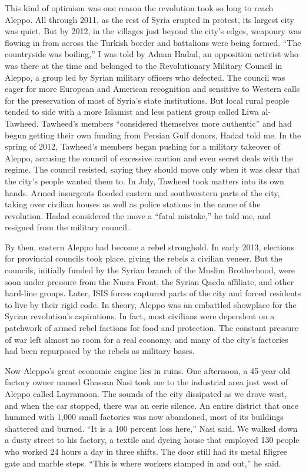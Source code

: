 This kind of optimism was one reason the revolution took so long to
reach Aleppo. All through 2011, as the rest of Syria erupted in protest,
its largest city was quiet. But by 2012, in the villages just beyond the
city's edges, weaponry was flowing in from across the Turkish border and
battalions were being formed. ``The countryside was boiling,'' I was
told by Adnan Hadad, an opposition activist who was there at the time
and belonged to the Revolutionary Military Council in Aleppo, a group
led by Syrian military officers who defected. The council was eager for
more European and American recognition and sensitive to Western calls
for the preservation of most of Syria's state institutions. But local
rural people tended to side with a more Islamist and less patient group
called Liwa al-Tawheed. Tawheed's members ``considered themselves more
authentic'' and had begun getting their own funding from Persian Gulf
donors, Hadad told me. In the spring of 2012, Tawheed's members began
pushing for a military takeover of Aleppo, accusing the council of
excessive caution and even secret deals with the regime. The council
resisted, saying they should move only when it was clear that the city's
people wanted them to. In July, Tawheed took matters into its own hands.
Armed insurgents flooded eastern and southwestern parts of the city,
taking over civilian houses as well as police stations in the name of
the revolution. Hadad considered the move a ``fatal mistake,'' he told
me, and resigned from the military council.

By then, eastern Aleppo had become a rebel stronghold. In early 2013,
elections for provincial councils took place, giving the rebels a
civilian veneer. But the councils, initially funded by the Syrian branch
of the Muslim Brotherhood, were soon under pressure from the Nusra
Front, the Syrian Qaeda affiliate, and other hard-line groups. Later,
ISIS forces captured parts of the city and forced residents to live by
their rigid code. In theory, Aleppo was an embattled showplace for the
Syrian revolution's aspirations. In fact, most civilians were dependent
on a patchwork of armed rebel factions for food and protection. The
constant pressure of war left almost no room for a real economy, and
many of the city's factories had been repurposed by the rebels as
military bases.

Now Aleppo's great economic engine lies in ruins. One afternoon, a
45-year-old factory owner named Ghassan Nasi took me to the industrial
area just west of Aleppo called Layramoon. The sounds of the city
dissipated as we drove west, and when the car stopped, there was an
eerie silence. An entire district that once hummed with 1,000 small
factories was now abandoned, most of its buildings shattered and burned.
``It is a 100 percent loss here,'' Nasi said. We walked down a dusty
street to his factory, a textile and dyeing house that employed 130
people who worked 24 hours a day in three shifts. The door still had its
metal filigree gate and marble steps. ``This is where workers stamped in
and out,'' he said.

